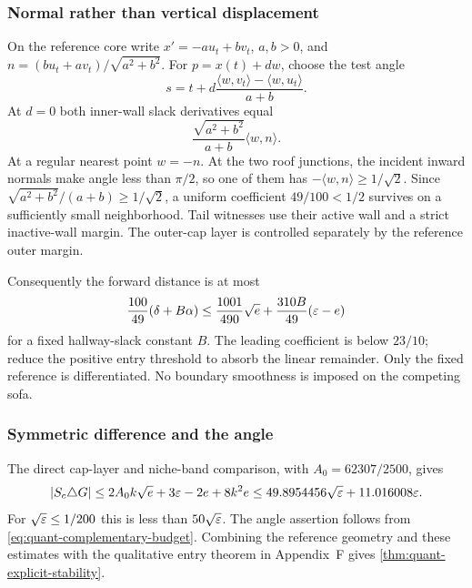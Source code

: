 \subsubsection{Normal rather than vertical displacement}

On the reference core write $x'=-a u_t+b v_t$, $a,b>0$, and
$n=(b u_t+a v_t)/\sqrt{a^2+b^2}$. For $p=x(t)+dw$, choose the test angle
\[
 s=t+d\frac{\langle w,v_t\rangle-\langle w,u_t\rangle}{a+b}.
\]
At $d=0$ both inner-wall slack derivatives equal
\[
 \frac{\sqrt{a^2+b^2}}{a+b}\langle w,n\rangle.
\]
At a regular nearest point $w=-n$. At the two roof junctions, the incident
inward normals make angle less than $\pi/2$, so one of them has
$-\langle w,n\rangle\ge1/\sqrt2$. Since
$\sqrt{a^2+b^2}/(a+b)\ge1/\sqrt2$, a uniform coefficient $49/100<1/2$
survives on a sufficiently small neighborhood. Tail witnesses use their active
wall and a strict inactive-wall margin. The outer-cap layer is controlled
separately by the reference outer margin.

Consequently the forward distance is at most
\[
 \frac{100}{49}(\delta+B\alpha)
 \le\frac{1001}{490}\sqrt e+\frac{310B}{49}(\varepsilon-e)
\]
for a fixed hallway-slack constant $B$. The leading coefficient is below
$23/10$; reduce the positive entry threshold to absorb the linear remainder.
Only the fixed reference is differentiated. No boundary smoothness is imposed
on the competing sofa.

\subsubsection{Symmetric difference and the angle}

The direct cap-layer and niche-band comparison, with
$A_0=62307/2500$, gives
\[
 \lvert S_c\triangle G\rvert
 \le 2A_0k\sqrt e+3\varepsilon-2e+8k^2e
 \le49.8954456\sqrt{\varepsilon}+11.016008\varepsilon.
\]
For $\sqrt{\varepsilon}\le1/200$ this is less than $50\sqrt{\varepsilon}$.
The angle assertion follows from \cref{eq:quant-complementary-budget}.
Combining the reference geometry and these estimates with the qualitative
entry theorem in Appendix~F gives \cref{thm:quant-explicit-stability}.


